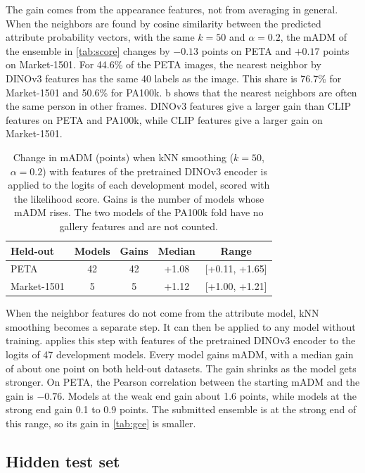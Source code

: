 \documentclass[10pt,twocolumn,letterpaper]{article}
\begin{document}
The gain comes from the appearance features, not from averaging in general. When the neighbors are found by cosine similarity between the predicted attribute probability vectors, with the same $k=50$ and $\alpha=0.2$, the mADM of the ensemble in \cref{tab:score} changes by $-0.13$ points on PETA and $+0.17$ points on Market-1501. For 44.6\% of the PETA images, the nearest neighbor by DINOv3 features has the same 40 labels as the image. This share is 76.7\% for Market-1501 and 50.6\% for PA100k. b shows that the nearest neighbors are often the same person in other frames. DINOv3 features give a larger gain than CLIP features on PETA and PA100k, while CLIP features give a larger gain on Market-1501.

\begin{table}[t]
\centering
\small
\setlength{\tabcolsep}{3.5pt}
\begin{tabular}{@{}lcccc@{}}
\toprule
Held-out & Models & Gains & Median & Range \\
\midrule
PETA & 42 & 42 & +1.08 & {[}+0.11, +1.65{]} \\
Market-1501 & 5 & 5 & +1.12 & {[}+1.00, +1.21{]} \\
\bottomrule
\end{tabular}
\caption{Change in mADM (points) when kNN smoothing ($k=50$, $\alpha=0.2$) with features of the pretrained DINOv3 encoder is applied to the logits of each development model, scored with the likelihood score. Gains is the number of models whose mADM rises. The two models of the PA100k fold have no gallery features and are not counted.}
\label{tab:knngen}
\end{table}

When the neighbor features do not come from the attribute model, kNN smoothing becomes a separate step. It can then be applied to any model without training.  applies this step with features of the pretrained DINOv3 encoder to the logits of 47 development models. Every model gains mADM, with a median gain of about one point on both held-out datasets. The gain shrinks as the model gets stronger. On PETA, the Pearson correlation between the starting mADM and the gain is $-0.76$. Models at the weak end gain about 1.6 points, while models at the strong end gain 0.1 to 0.9 points. The submitted ensemble is at the strong end of this range, so its gain in \cref{tab:gce} is smaller.

\subsection{Hidden test set}
\label{sec:test}
\end{document}
